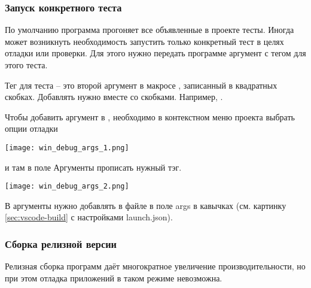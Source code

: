 \subsubsection{Запуск конкретного теста}

По умолчанию программа  прогоняет все объявленные в проекте тесты. Иногда может возникнуть необходимость
запустить только конкретный тест в целях отладки или проверки.
Для этого нужно передать программе аргумент с тегом для этого теста.

Тег для теста -- это второй аргумент в макросе , записанный в квадратных скобках.
Добавлять нужно вместе со скобками. Например, \cvar{[ping]}.

Чтобы добавить аргумент в , необходимо в контекстном меню проекта  выбрать опции отладки
\begin{center}
\texttt{[image: win\_debug\_args\_1.png]}
\end{center}
и там в поле Аргументы прописать нужный тэг.
\begin{center}
\texttt{[image: win\_debug\_args\_2.png]}
\end{center}

В  аргументы нужно добавлять в файле  в поле args в кавычках
(см. картинку \ref{sec:vscode-build} с настройками launch.json).

\subsubsection{Сборка релизной версии}
\label{sec:release-build}

Релизная сборка программ даёт многократное увеличение производительности,
но при этом отладка приложений в таком режиме невозможна.

